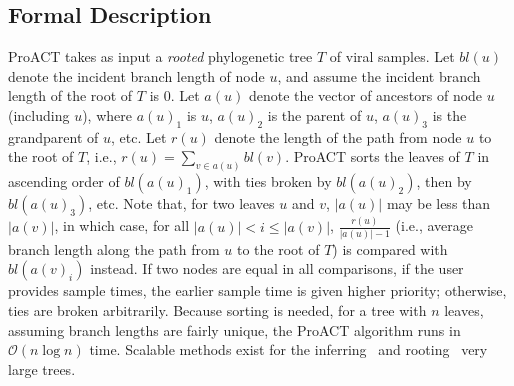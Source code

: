 \documentclass[a4paper,11pt]{article}
\newcommand{\bigO}{\mathcal{O}}
\newcommand{\PLWH}{sample\xspace}
\newcommand{\D}{D}
\newcommand{\ta}[1][A]{t'}
\newcommand{\tb}{t'}
\begin{document}
\subsection{Formal Description}
ProACT takes as input a {\em rooted} phylogenetic tree $T$ of viral samples. %
Let $bl(u)$ denote the incident branch length of node $u$,
and assume the incident branch length of the root of $T$ is 0.
Let $a(u)$ denote the vector of ancestors of node $u$ (including $u$),
where $a(u)_1$ is $u$,
$a(u)_2$ is the parent of $u$,
$a(u)_3$ is the grandparent of $u$, etc.
Let $r(u)$ denote the length of the path from node $u$ to the root of $T$,
i.e., $r(u)=\sum_{v\in a(u)}{bl(v)}$.
ProACT sorts the leaves of $T$ in ascending order of $bl(a(u)_1)$,
with ties broken by $bl(a(u)_2)$, then by $bl(a(u)_3)$, etc.
Note that, for two leaves $u$ and $v$,
$|a(u)|$ may be less than $|a(v)|$,
in which case, for all $|a(u)|<i\le|a(v)|$,
$\frac{r(u)}{|a(u)|-1}$ (i.e., average branch length along the path from $u$ to the root of $T$) is compared with $bl(a(v)_i)$ instead.
If two nodes are equal in all comparisons, if the user provides sample times, the earlier sample time is given higher priority; otherwise, ties are broken arbitrarily.
Because sorting is needed, for a tree with $n$ leaves,
assuming branch lengths are fairly unique,
the ProACT algorithm runs in $\bigO(n\log n)$ time. Scalable methods exist  for the inferring~\supercite{Price2010,Nguyen2015} and rooting~\supercite{Mai2017} very large trees.

\end{document}
